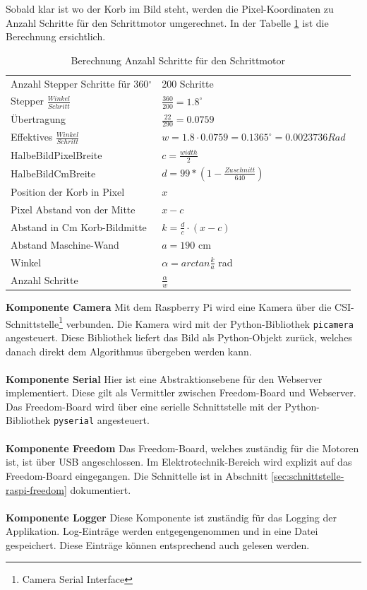 \newpage
Sobald klar ist wo der Korb im Bild steht, werden die Pixel-Koordinaten zu Anzahl Schritte für den Schrittmotor umgerechnet. In der Tabelle \ref{tab:berechnung-steps} ist die Berechnung ersichtlich. 

\begin{table}[h!]
	\renewcommand{\arraystretch}{1.5}
	\centering
	\begin{tabular}{l l}
		Anzahl Stepper Schritte für 360$^\circ$ & 200 Schritte \\
		Stepper $\frac{Winkel}{Schritt}$ & $\frac{360}{200} = 1.8^\circ$ \\
		Übertragung & $\frac{22}{290} = 0.0759$ \\
		Effektives $\frac{Winkel}{Schritt}$ & $w = 1.8 \cdot 0.0759 = 0.1365^\circ = 0.0023736 Rad$ \\
		HalbeBildPixelBreite & $c = \frac{width}{2}$ \\
		HalbeBildCmBreite & $d = 99*(1-\frac{Zuschnitt}{640})$ \\
		Position der Korb in Pixel & $x$ \\
		Pixel Abstand von der Mitte & $x - c$ \\
		Abstand in Cm Korb-Bildmitte & $k = \frac{d}{c} \cdot (x-c)$ \\
		Abstand Maschine-Wand & $a = 190$ cm \\
		Winkel & $\alpha = arctan\frac{k}{a}$ rad \\
		Anzahl Schritte & $\frac{\alpha}{w}$ \\
	\end{tabular}
	\label{tab:berechnung-steps}
	\caption{Berechnung Anzahl Schritte für den Schrittmotor}
\end{table}

\noindent
\textbf{Komponente Camera}
Mit dem Raspberry Pi wird eine Kamera über die CSI-Schnittstelle\footnote{Camera Serial Interface} verbunden. Die Kamera wird mit der Python-Bibliothek \texttt{picamera} angesteuert. Diese Bibliothek liefert das Bild als Python-Objekt zurück, welches danach direkt dem Algorithmus übergeben werden kann.
\\
\\
\textbf{Komponente Serial}
Hier ist eine Abstraktionsebene für den Webserver implementiert. Diese gilt als Vermittler zwischen Freedom-Board und Webserver. Das Freedom-Board wird über eine serielle Schnittstelle mit der Python-Bibliothek \texttt{pyserial} angesteuert.
\\
\\
\textbf{Komponente Freedom}
Das Freedom-Board, welches zuständig für die Motoren ist, ist über USB angeschlossen. Im Elektrotechnik-Bereich wird explizit auf das Freedom-Board eingegangen. Die Schnittelle ist in Abschnitt \ref{sec:schnittstelle-raspi-freedom} dokumentiert.
\\
\\
\textbf{Komponente Logger}
Diese Komponente ist zuständig für das Logging der Applikation. Log-Einträge werden entgegengenommen und in eine Datei gespeichert. Diese Einträge können entsprechend auch gelesen werden.
